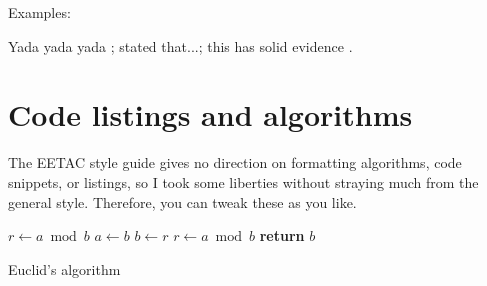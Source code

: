 Examples:
\begin{outline}
    \1[] Yada yada yada \cite{incollection}; \textcite{articlelargepages} stated that...; this has solid evidence \cite{dawson,ieec,bookwitheditor}. \nocite{Li2007}
\end{outline}

\section{Code listings and algorithms}

The EETAC style guide gives no direction on formatting algorithms, code snippets, or listings, so I took some liberties without straying much from the general style. Therefore, you can tweak these as you like.

{\centering
\begin{minipage}{.7\linewidth}
    \begin{algorithm}[H]
        \begin{algorithmic}[1]
            \State $r\gets a\bmod b$
            \State $a\gets b$
            \State $b\gets r$
            \State $r\gets a\bmod b$
            \EndWhile\label{euclidendwhile}
            \State \textbf{return} $b$
            \EndProcedure
        \end{algorithmic}
        \caption{Euclid's algorithm}
        \label{euclid}
    \end{algorithm}
\end{minipage}
\par
}

\begin{listing}[htbp!]
    \label{code:example}
    \inputminted[]{python}{img/example.py}
\end{listing}